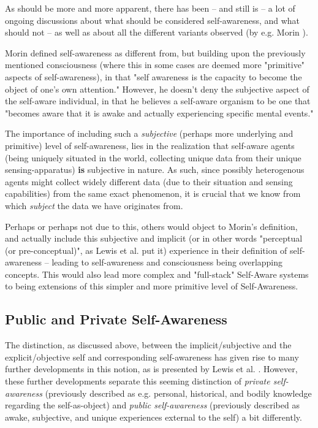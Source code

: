 \documentclass{article}
\begin{document}
As should be more and more apparent, there has been -- and still is -- a lot of ongoing discussions about what should be considered self-awareness, and what should not -- as well as about all the different variants observed (by e.g. Morin \cite{morin}).

Morin defined self-awareness as different from, but building upon the previously mentioned consciousness (where this in some cases are deemed more "primitive" aspects of self-awareness), in that "self awareness is the capacity to become the object of one's own attention." However, he doesn't deny the subjective aspect of the self-aware individual, in that he believes a self-aware organism to be one that "becomes aware that it is awake and actually experiencing specific mental events."

The importance of including such a \textit{subjective} (perhaps more underlying and primitive) level of self-awareness, lies in the realization that self-aware agents (being uniquely situated in the world, collecting unique data from their unique sensing-apparatus) \textbf{is} subjective in nature. As such, since possibly heterogenous agents might collect widely different data (due to their situation and sensing capabilities) from the same exact phenomenon, it is crucial that we know from which \textit{subject} the data we have originates from.

Perhaps or perhaps not due to this, others would object to Morin's definition, and actually include this subjective and implicit (or in other words "perceptual (or pre-conceptual)", as Lewis et al. \cite{sacs16_ch2} put it) experience in their definition of self-awareness -- leading to self-awareness and consciousness being overlapping concepts. This would also lead more complex and "full-stack" Self-Aware systems to being extensions of this simpler and more primitive level of Self-Awareness.

\subsection{Public and Private Self-Awareness}

The distinction, as discussed above, between the implicit/subjective and the explicit/objective self and corresponding self-awareness has given rise to many further developments in this notion, as is presented by Lewis et al. \cite{sacs16_ch2}. However, these further developments separate this seeming distinction of \textit{private self-awareness} (previously described as e.g. personal, historical, and bodily knowledge regarding the self-as-object) and \textit{public self-awareness} (previously described as awake, subjective, and unique experiences external to the self) a bit differently.
\end{document}
